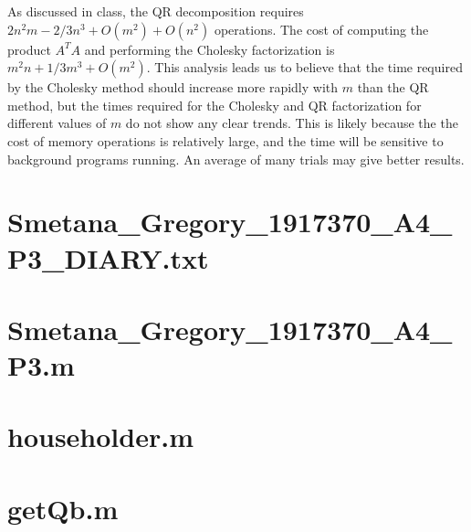 \documentclass[11pt]{article} %
\begin{document}
As discussed in class, the QR decomposition requires $2n^2m - 2/3 n^3 + O(m^2)+O(n^2)$ operations. The cost of computing the product $A^TA$ and performing the Cholesky factorization is $ m^2n + 1/3 m^3+ O(m^2)$. This analysis leads us to believe that the time required by the Cholesky method should increase more rapidly with $m$ than the QR method, but the times required for the Cholesky and QR factorization for different values of $m$ do not show any clear trends. This is likely because the the cost of memory operations is relatively large, and the time will be sensitive to background programs running. An average of many trials may give better results.

\clearpage
\appendix
\section{Smetana\_Gregory\_1917370\_A4\_P3\_DIARY.txt}


\section{Smetana\_Gregory\_1917370\_A4\_P3.m}


\section{householder.m}


\section{getQb.m}

\end{document}
